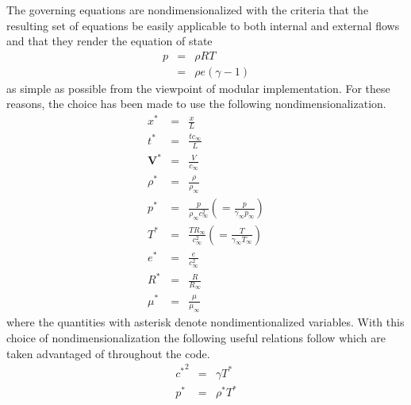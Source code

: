The governing equations are nondimensionalized with the criteria that the resulting set of equations be easily applicable to both internal and external flows and that they render the equation of state
\begin{eqnarray*}
p &=& \rho R T \\
  &=& \rho e \left(\gamma - 1\right)
\end{eqnarray*}
as simple as possible from the viewpoint of modular implementation. For these reasons, the choice has been made to use the following nondimensionalization.
\begin{eqnarray*}
x^* &=& \frac{x}{L} \\
t^* &=& \frac{t c_{\infty}}{L} \\
\mathbf{V}^* &=& \frac{V}{c_{\infty}} \\
\rho^* &=& \frac{\rho}{\rho_\infty} \\
p^* &=& \frac{p}{\rho_\infty c_\infty^2} \left( = \frac{p}{\gamma_\infty p_\infty} \right) \\
T^* &=& \frac{T R_\infty}{c_\infty^2} \left( = \frac{T}{\gamma_\infty T_\infty} \right) \\
e^* &=& \frac{e}{c_\infty^2} \\
R^* &=& \frac{R}{R_\infty} \\
\mu^* &=& \frac{\mu}{\mu_\infty}
\end{eqnarray*}
where the quantities with asterisk denote nondimentionalized variables. With this choice of nondimensionalization the following useful relations follow which are taken advantaged of throughout the code.
\begin{eqnarray*}
{c^*}^2 &=& \gamma T^* \\
p^* &=& \rho^* T^*
\end{eqnarray*}

